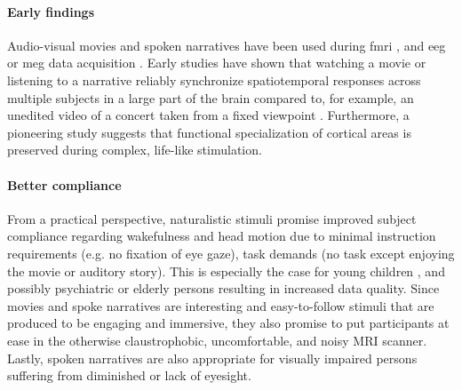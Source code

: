 \paragraph{Early findings}
Audio-visual movies and spoken narratives have been used during \ac{fmri}
\citep[s.][for reviews]{hamilton2018revolution, hasson2008neurocinematics,
sonkusare2019naturalistic, saarimaki2021naturalistic}, and \ac{eeg} or \ac{meg}
data acquisition \citep[s.][for reviews]{alday2019meg, kandylaki2019story}.
%
Early studies have shown that watching a movie \citep{hasson2004intersubject,
hasson2008neurocinematics, hasson2010reliability} or listening to a narrative
\citep{lerner2011topographic, wilson2008beyond} reliably synchronize
spatiotemporal responses across multiple subjects in a large part of the brain
compared to, for example, an unedited video of a concert taken from a fixed
viewpoint \citep{hasson2004intersubject, hasson2008neurocinematics,
hasson2010reliability, lerner2011topographic, wilson2008beyond}.
%
Furthermore, a pioneering study \citep{bartels2004mapping} suggests that
functional specialization of cortical areas is preserved during complex,
life-like stimulation.


\paragraph{Better compliance}
%
From a practical perspective, naturalistic stimuli promise improved subject
compliance regarding wakefulness and head motion due to minimal instruction
requirements (e.g. no fixation of eye gaze), task demands (no task except
enjoying the movie or auditory story).
%
This is especially the case for young children \citep{vanderwal2015inscapes},
and possibly psychiatric \citep{eickhoff2020towards} or elderly persons
resulting in increased data quality.
%
Since movies and spoke narratives are interesting and easy-to-follow stimuli
that are produced to be engaging and immersive, they also promise to put
participants at ease in the otherwise claustrophobic, uncomfortable, and noisy
MRI scanner.
%
Lastly, spoken narratives are also appropriate for visually impaired persons
suffering from diminished or lack of eyesight.


